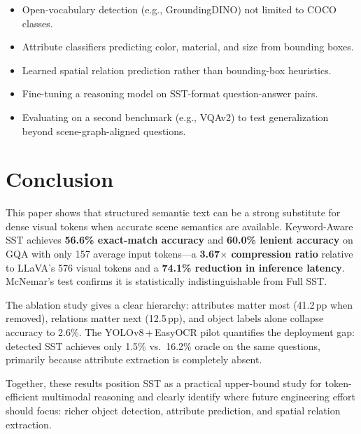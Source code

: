 \documentclass[10pt,twocolumn]{article}
\begin{document}
\begin{itemize}
  \item Open-vocabulary detection (e.g., GroundingDINO) not limited to COCO classes.
  \item Attribute classifiers predicting color, material, and size from bounding boxes.
  \item Learned spatial relation prediction rather than bounding-box heuristics.
  \item Fine-tuning a reasoning model on SST-format question-answer pairs.
  \item Evaluating on a second benchmark (e.g., VQAv2) to test generalization beyond scene-graph-aligned questions.
\end{itemize}

\section{Conclusion}

This paper shows that structured semantic text can be a strong substitute for dense visual tokens when accurate scene semantics are available. Keyword-Aware SST achieves \textbf{56.6\% exact-match accuracy} and \textbf{60.0\% lenient accuracy} on GQA with only 157 average input tokens---a \textbf{3.67$\times$ compression ratio} relative to LLaVA's 576 visual tokens and a \textbf{74.1\% reduction in inference latency}. McNemar's test confirms it is statistically indistinguishable from Full SST.

The ablation study gives a clear hierarchy: attributes matter most (41.2\,pp when removed), relations matter next (12.5\,pp), and object labels alone collapse accuracy to 2.6\%. The YOLOv8\,+\,EasyOCR pilot quantifies the deployment gap: detected SST achieves only 1.5\% vs.\ 16.2\% oracle on the same questions, primarily because attribute extraction is completely absent.

Together, these results position SST as a practical upper-bound study for token-efficient multimodal reasoning and clearly identify where future engineering effort should focus: richer object detection, attribute prediction, and spatial relation extraction.
\end{document}
